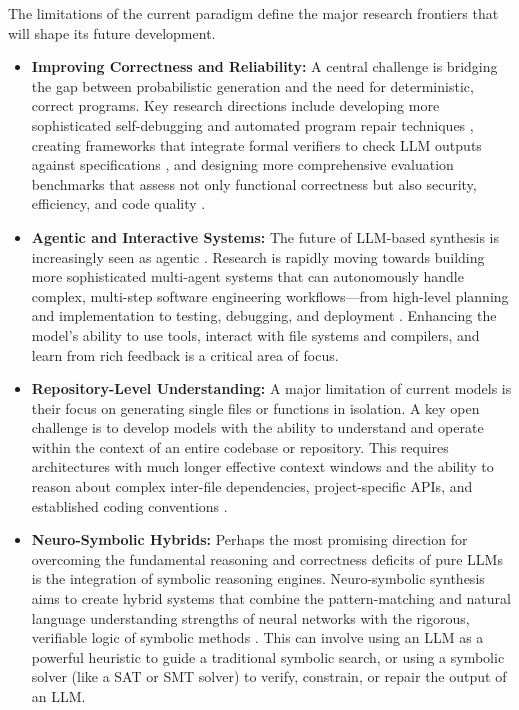 \documentclass[12pt, a4paper]{report}
\begin{document}
The limitations of the current paradigm define the major research frontiers that will shape its future development.
\begin{itemize}
    \item \textbf{Improving Correctness and Reliability:} A central challenge is bridging the gap between probabilistic generation and the need for deterministic, correct programs. Key research directions include developing more sophisticated self-debugging and automated program repair techniques \citep{shinn2023reflexion}, creating frameworks that integrate formal verifiers to check LLM outputs against specifications \citep{zhang2023fusing}, and designing more comprehensive evaluation benchmarks that assess not only functional correctness but also security, efficiency, and code quality \citep{kaddour2023challenges}.
    \item \textbf{Agentic and Interactive Systems:} The future of LLM-based synthesis is increasingly seen as agentic \citep{wang2023survey}. Research is rapidly moving towards building more sophisticated multi-agent systems that can autonomously handle complex, multi-step software engineering workflows—from high-level planning and implementation to testing, debugging, and deployment \citep{luo2023wizardcoder}. Enhancing the model's ability to use tools, interact with file systems and compilers, and learn from rich feedback is a critical area of focus.
    \item \textbf{Repository-Level Understanding:} A major limitation of current models is their focus on generating single files or functions in isolation. A key open challenge is to develop models with the ability to understand and operate within the context of an entire codebase or repository. This requires architectures with much longer effective context windows and the ability to reason about complex inter-file dependencies, project-specific APIs, and established coding conventions \citep{luo2023wizardcoder}.
    \item \textbf{Neuro-Symbolic Hybrids:} Perhaps the most promising direction for overcoming the fundamental reasoning and correctness deficits of pure LLMs is the integration of symbolic reasoning engines. Neuro-symbolic synthesis aims to create hybrid systems that combine the pattern-matching and natural language understanding strengths of neural networks with the rigorous, verifiable logic of symbolic methods \citep{pan2023logic}. This can involve using an LLM as a powerful heuristic to guide a traditional symbolic search, or using a symbolic solver (like a SAT or SMT solver) to verify, constrain, or repair the output of an LLM.
\end{itemize}
\end{document}
